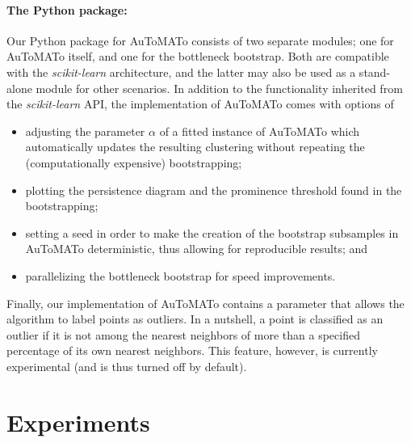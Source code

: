 \documentclass[10pt]{article} %
\theoremstyle{plain}
\newcommand{\aut}{AuToMATo\xspace}
\begin{document}
\paragraph{The Python package:} Our Python package for \aut consists of two separate modules; one for \aut itself, and one for the bottleneck bootstrap. Both are compatible with the \emph{scikit-learn} architecture, and the latter may also be used as a stand-alone module for other scenarios. In addition to the functionality inherited from the \emph{scikit-learn} API, the implementation of \aut comes with options of
\begin{itemize}[nolistsep]
    \item adjusting the parameter \(\alpha\) of a fitted instance of \aut which automatically updates the resulting clustering without repeating the (computationally expensive) bootstrapping;
    \item plotting the persistence diagram and the prominence threshold found in the bootstrapping;
    \item setting a seed in order to make the creation of the bootstrap subsamples in \aut deterministic, thus allowing for reproducible results; and
    \item parallelizing the bottleneck bootstrap for speed improvements.
\end{itemize}
Finally, our implementation of \aut contains a parameter that allows the algorithm to label points as outliers.
In a nutshell, a point is classified as an outlier if it is not among the nearest neighbors of more than a specified percentage of its own nearest neighbors. This feature, however, is currently experimental (and is thus turned off by default).


\section{Experiments}\label{sec:experiments}
\end{document}
